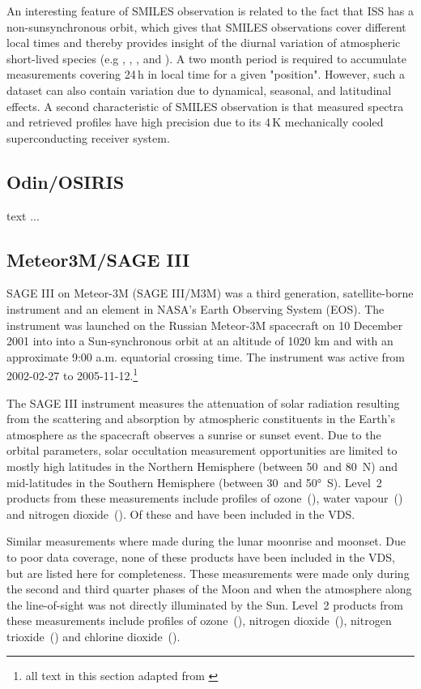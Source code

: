 An interesting feature of SMILES observation is related to the fact
that ISS has a non-sunsynchronous orbit, which gives that SMILES 
observations cover different local times and thereby provides insight
of the diurnal variation of atmospheric short-lived species
(e.g , , , and ). 
A two month period is required to accumulate measurements covering 
24\,h in local time for a given "position". However, such a 
dataset can also contain variation due to dynamical, seasonal, and 
latitudinal effects.
A second characteristic of SMILES observation is that 
measured spectra and retrieved profiles have high precision due 
to its 4\,K mechanically cooled superconducting receiver system.



\subsection{Odin/OSIRIS}
 
text ...

\subsection{Meteor3M/SAGE III}
SAGE III on Meteor-3M (SAGE III/M3M) was a third generation, satellite-borne
instrument and an element in NASA’s Earth Observing System (EOS). The
instrument was launched on the Russian Meteor-3M spacecraft on 10 December 2001
into into a Sun-synchronous orbit at an altitude of 1020 km and with an
approximate 9:00 a.m. equatorial crossing time.  The instrument was active from
2002-02-27 to 2005-11-12.\footnote{all text in this section adapted from
\cite{SAGEIII_DPUG}}

The SAGE III instrument measures the attenuation of solar radiation resulting
from the scattering and absorption by atmospheric constituents in the Earth’s
atmosphere as the spacecraft observes a sunrise or sunset event.  Due to the
orbital parameters, solar occultation measurement opportunities are limited to
mostly high latitudes in the Northern Hemisphere (between 50\degree~and
80\degree~N) and mid-latitudes in the Southern Hemisphere (between
30\degree~and 50°~S).  Level~2 products from these measurements include
profiles of ozone~(), water vapour~() and nitrogen
dioxide~().  Of these  and  have been included
in the VDS.

Similar measurements where made during the lunar moonrise and moonset. Due to
poor data coverage, none of these products have been included in the VDS, but
are listed here for completeness.  These measurements were made only during the
second and third quarter phases of the Moon and when the atmosphere along the
line-of-sight was not directly illuminated by the Sun.  Level~2 products from
these measurements include profiles of ozone~(), nitrogen
dioxide~(), nitrogen trioxide~() and chlorine
dioxide~().



